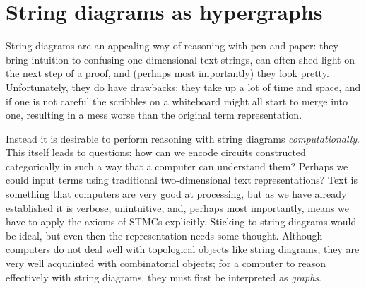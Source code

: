 \chapter{String diagrams as hypergraphs}\label{chap:hypergraphs}

String diagrams are an appealing way of reasoning with pen and paper: they bring
intuition to confusing one-dimensional text strings, can often shed light on the
next step of a proof, and (perhaps most importantly) they look pretty.
Unfortunately, they do have drawbacks: they take up a lot of time and space, and
if one is not careful the scribbles on a whiteboard might all start to merge
into one, resulting in a mess worse than the original term representation.

Instead it is desirable to perform reasoning with string diagrams
\emph{computationally}.
This itself leads to questions: how can we encode circuits constructed
categorically in such a way that a computer can understand them?
Perhaps we could input terms using traditional two-dimensional text
representations?
Text is something that computers are very good at processing, but as we have
already established it is verbose, unintuitive, and, perhaps most importantly,
means we have to apply the axioms of STMCs explicitly.
Sticking to string diagrams would be ideal, but even then the representation
needs some thought.
Although computers do not deal well with topological objects like string
diagrams, they are very well acquainted with combinatorial objects; for
a computer to reason effectively with string diagrams, they must first be
interpreted as \emph{graphs}.








